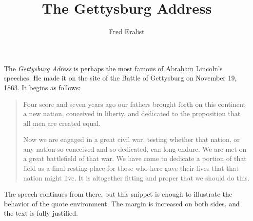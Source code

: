 \documentclass{article}
\title{The Gettysburg Address}
\author{Fred Eralist}
\date{}
\begin{document}
\maketitle

The \textit{Gettysburg Adress} is perhaps the most famous of Abraham Lincoln's speeches. He made it on the site of the Battle of Gettysburg on November 19, 1863. It begins as follows:

\begin{quote}

Four score and seven years ago our fathers brought forth on this continent a new nation, conceived in liberty, and dedicated to the proposition that all men are created equal.

Now we are engaged in a great civil war, testing whether that nation, or any nation so conceived and so dedicated, can long endure. We are met on a great battlefield of that war. We have come to dedicate a portion of that field as a final resting place for those who here gave their lives that that nation might live. It is altogether fitting and proper that we should do this.

\end{quote}

The speech continues from there, but this snippet is enough to illustrate the behavior of the quote environment. The margin is increased on both sides, and the text is fully justified.
\end{document}
